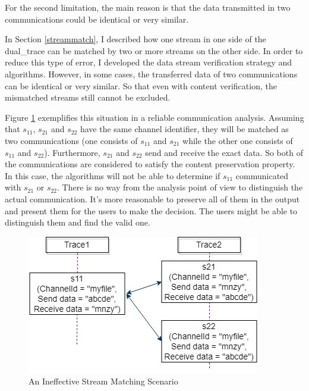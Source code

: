 For the second limitation, the main reason is that the data transmitted in two communications could be identical or very similar. 

In Section \ref{streammatch}, I described how one stream in one side of the dual\_trace can be matched by two or more streams on the other side. In order to reduce this type of error, I developed the data stream verification strategy and algorithms. However, in some cases, the transferred data of two communications can be identical or very similar. So that even with content verification, the mismatched streams still cannot be excluded.

Figure \ref{secondlevelmatching} exemplifies this situation in a reliable communication analysis. Assuming that $s_{11}$, $s_{21}$ and $s_{22}$ have the same channel identifier, they will be matched as two communications (one consists of $s_{11}$ and $s_{21}$ while the other one consists of $s_{11}$ and $s_{22}$). Furthermore, $s_{21}$ and $s_{22}$ send and receive the exact data. So both of the communications are considered to satisfy the content preservation property. In this case, the algorithms will not be able to determine if  $s_{11}$ communicated with $s_{21}$ or $s_{22}$. There is no way from the analysis point of view to distinguish the actual communication. It's more reasonable to preserve all of them in the output and present them for the users to make the decision. The users might be able to distinguish them and find the valid one.


\begin{figure}[H]
\centerline{\includegraphics{Figures/secondlevelmatching}}
 \caption{An Ineffective Stream Matching Scenario}
\label{secondlevelmatching}
\end{figure}



